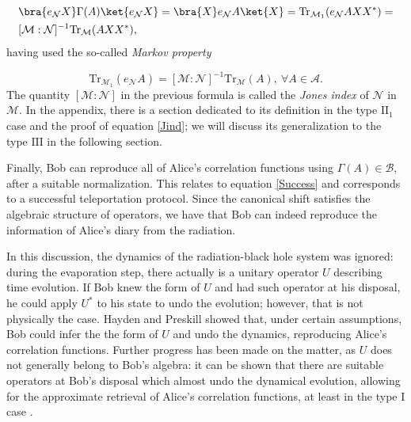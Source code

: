 \documentclass[a4paper,11pt]{article}
\begin{document}
\begin{equation}
    \begin{split}
        &\bra{e_{\mathcal{N}} X} \Gamma (A) \ket{e_{\mathcal{N}} X} = \bra{X} e_{\mathcal{N}} A \ket{X} = \mathrm{Tr}_{\mathcal{M}_1} (e_{\mathcal{N}} A X X^*) = \\
        &[\mathcal{M} : \mathcal{N}]^{-1} \mathrm{Tr}_{\mathcal{M}} (A X X^*) \text{,}
    \end{split}
    \label{fResult}
\end{equation}
%
having used the so-called \textit{Markov property}

\begin{equation}
    \mathrm{Tr}_{\mathcal{M}_1}(e_{\mathcal{N}} A) = [\mathcal{M} : \mathcal{N}]^{-1} \mathrm{Tr}_{\mathcal{M}}(A), \ \forall A \in \mathcal{A} \text{.}
    \label{Jind}
\end{equation}
%
The quantity $[\mathcal{M} : \mathcal{N}]$ in the previous formula is called the \textit{Jones index} of $\mathcal{N}$ in $\mathcal{M}$. In the appendix, there is a section dedicated to its definition in the type $\mathrm{II}_1$ case and the proof of equation \ref{Jind}; we will discuss its generalization to the type $\mathrm{III}$ in the following section.

Finally, Bob can reproduce all of Alice's correlation functions using $\Gamma (A) \in \mathcal{B}$, after a suitable normalization. This relates to equation \ref{Success} and corresponds to a successful teleportation protocol. Since the canonical shift satisfies the algebraic structure of operators, we have that Bob can indeed reproduce the information of Alice's diary from the radiation.

In this discussion, the dynamics of the radiation-black hole system was ignored: during the evaporation step, there actually is a unitary operator $U$ describing time evolution. If Bob knew the form of $U$ and had such operator at his disposal, he could apply $U^*$ to his state to undo the evolution; however, that is not physically the case. Hayden and Preskill \cite{Hayden} showed that, under certain assumptions, Bob could infer the the form of $U$ and undo the dynamics, reproducing Alice's correlation functions. Further progress has been made on the matter, as $U$ does not generally belong to Bob's algebra: it can be shown that there are suitable operators at Bob's disposal which almost undo the dynamical evolution, allowing for the approximate retrieval of Alice's correlation functions, at least in the type $\mathrm{I}$ case \cite{Yoshida}.
\end{document}
